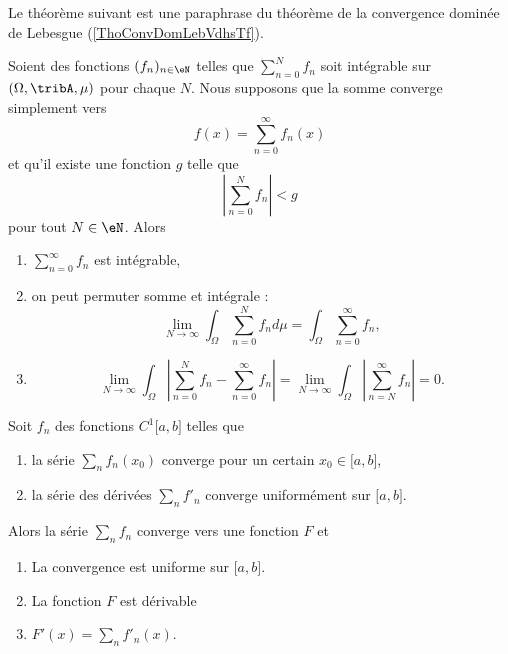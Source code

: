 Le théorème suivant est une paraphrase du théorème de la convergence dominée de Lebesgue (\ref{ThoConvDomLebVdhsTf}).
\begin{theorem}     \label{ThoockMHn}
	Soient des fonctions \( (f_n)_{n\in \eN}\) telles que \( \sum_{n=0}^Nf_n\) soit intégrable sur \( (\Omega,\tribA,\mu)\) pour chaque \( N\). Nous supposons que la somme converge simplement vers
	\begin{equation}
		f(x)=\sum_{n=0}^{\infty}f_n(x)
	\end{equation}
	et qu'il existe une fonction \( g\) telle que
	\begin{equation}
		\left| \sum_{n=0}^Nf_n \right| <g
	\end{equation}
	pour tout \( N\in \eN\). Alors
	\begin{enumerate}
		\item
		      \( \sum_{n=0}^{\infty}f_n\) est intégrable,
		\item
		      on peut permuter somme et intégrale :
		      \begin{equation}
			      \lim_{N\to \infty} \int_{\Omega}\sum_{n=0}^Nf_nd\mu=\int_{\Omega}\sum_{n=0}^{\infty}f_n,
		      \end{equation}
		\item
		      \begin{equation}
			      \lim_{N\to \infty} \int_{\Omega}\left| \sum_{n=0}^Nf_n-\sum_{n=0}^{\infty}f_n \right| =\lim_{N\to \infty} \int_{\Omega}\left| \sum_{n=N}^{\infty}f_n \right| =0.
		      \end{equation}
	\end{enumerate}
\end{theorem}


\begin{theorem} \label{ThoCSGaPY}
	Soit \( f_n\) des fonctions \( C^1\mathopen[ a , b \mathclose]\) telles que
	\begin{enumerate}
		\item
		      la série \( \sum_n f_n(x_0)\) converge pour un certain \( x_0\in\mathopen[ a , b \mathclose]\),
		\item
		      la série des dérivées \( \sum_n f'_n\) converge uniformément sur \( \mathopen[ a , b \mathclose]\).
	\end{enumerate}
	Alors la série \( \sum_n f_n\) converge vers une fonction \( F\) et
	\begin{enumerate}
		\item
		      La convergence est uniforme sur \( \mathopen[ a , b \mathclose]\).
		\item
		      La fonction \( F\) est dérivable
		\item
		      \( F'(x)=\sum_nf'_n(x)\).
	\end{enumerate}
\end{theorem}

